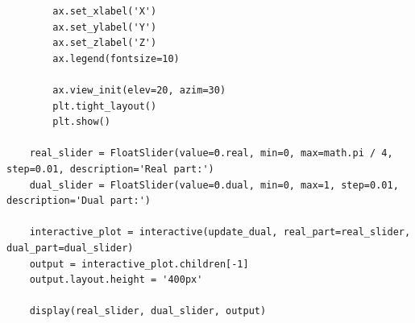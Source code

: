 \begin{verbatim}
        ax.set_xlabel('X')
        ax.set_ylabel('Y')
        ax.set_zlabel('Z')
        ax.legend(fontsize=10)

        ax.view_init(elev=20, azim=30)
        plt.tight_layout()
        plt.show()

    real_slider = FloatSlider(value=Θ.real, min=0, max=math.pi / 4, step=0.01, description='Real part:')
    dual_slider = FloatSlider(value=Θ.dual, min=0, max=1, step=0.01, description='Dual part:')

    interactive_plot = interactive(update_dual, real_part=real_slider, dual_part=dual_slider)
    output = interactive_plot.children[-1]
    output.layout.height = '400px'

    display(real_slider, dual_slider, output)
\end{verbatim}


